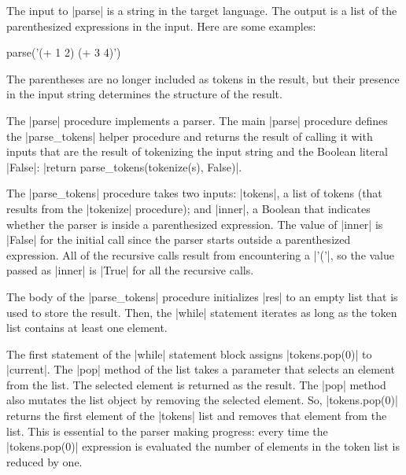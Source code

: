 The input to \pycode|parse| is a string in the target language.  The output is a list of the parenthesized expressions in the input.  Here are some examples:
\begin{pythoninteractsm}{parse('(+ 1 2) (+ 3 4)')}
\end{pythoninteractsm}

The parentheses are no longer included as tokens in the result, but their presence in the input string determines the structure of the result.

The \pycode|parse| procedure implements a  parser.  The main \pycode|parse| procedure defines the \pycode|parse_tokens| helper procedure and returns the result of calling it with inputs that are the result of tokenizing the input string and the Boolean literal \pycode|False|: \pycode|return parse_tokens(tokenize(s), False)|.  

The \pycode|parse_tokens| procedure takes two inputs: \pycode|tokens|, a list of tokens (that results from the \pycode|tokenize| procedure); and \pycode|inner|, a Boolean that indicates whether the parser is inside a parenthesized expression.  The value of \pycode|inner| is \pycode|False| for the initial call since the parser starts outside a parenthesized expression.  All of the recursive calls result from encountering a \pycode|'('|, so the value passed as \pycode|inner| is \pycode|True| for all the recursive calls.

The body of the \pycode|parse_tokens| procedure initializes \pycode|res| to an empty list that is used to store the result.  Then, the \pycode|while| statement iterates as long as the token list contains at least one element.  

The first statement of the \pycode|while| statement block assigns \pycode|tokens.pop(0)| to \pycode|current|.  The \pycode|pop| method of the list takes a parameter that selects an element from the list.  The selected element is returned as the result.  The \pycode|pop| method also mutates the list object by removing the selected element.  So, \pycode|tokens.pop(0)| returns the first element of the \pycode|tokens| list and removes that element from the list.  This is essential to the parser making progress: every time the \pycode|tokens.pop(0)| expression is evaluated the number of elements in the token list is reduced by one.  

